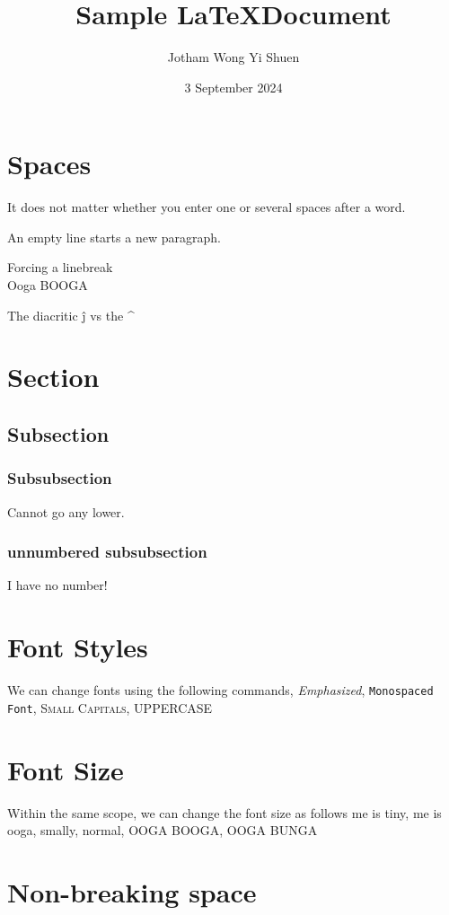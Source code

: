 \documentclass[12pt]{article}
\title{Sample \LaTeX Document}
\author{Jotham Wong Yi Shuen}
\date{3 September 2024}
\begin{document}
    \maketitle
    \tableofcontents

    \section{Spaces}
    It does not matter whether you
    enter one or several             spaces
    after a word.

    An empty line starts a new
    paragraph.
    
    Forcing a linebreak\\
    Ooga BOOGA

    The diacritic \^j vs the \^{}

    \section{Section}
    \subsection{Subsection}
    \subsubsection{Subsubsection}
    Cannot go any lower.
    \subsubsection*{unnumbered subsubsection}
    I have no number!

    \section{Font Styles}

    We can change fonts using the following commands, \emph{Emphasized}, \texttt{Monospaced Font}, \textsc{Small Capitals}, \uppercase{uppercase}

    \section{Font Size}

    Within the same scope, we can change the font size as follows {\tiny me is tiny}, {\scriptsize me is ooga}, {\small smally}, {\normalsize normal}, {\LARGE OOGA BOOGA}, {\Huge OOGA BUNGA}

    \section{Non-breaking space}
    
\end{document}
